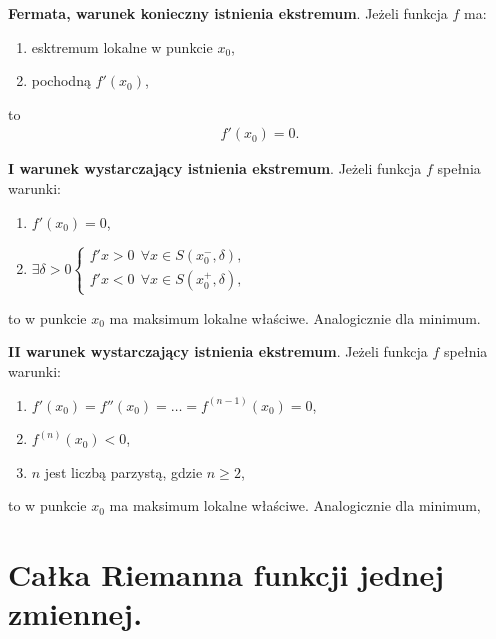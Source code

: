 \documentclass[12pt]{article}
\begin{document}
    \begin{theorem}
        \textbf{Fermata, warunek konieczny istnienia ekstremum}. Jeżeli funkcja $f$ ma:
        \begin{enumerate}
            \item esktremum lokalne w punkcie $x_0$,
            \item pochodną $f'(x_0)$,
        \end{enumerate}
        to
        \begin{align*}
            f'(x_0) = 0.
        \end{align*}
    \end{theorem}

    \begin{theorem}
        \textbf{I warunek wystarczający istnienia ekstremum}. Jeżeli funkcja $f$ spełnia warunki:
        \begin{enumerate}
            \item $f'(x_0) = 0$,
            \item $\exists \delta > 0
            \left\{\begin{matrix}
                       f'{x} > 0 ~~ \forall x \in  S(x^{-}_0, \delta), \\
                       f'{x} < 0 ~~ \forall x \in  S(x^{+}_0, \delta),
            \end{matrix}\right.$
        \end{enumerate}
        to w punkcie $x_0$ ma maksimum lokalne właściwe. Analogicznie dla minimum.
    \end{theorem}

    \begin{theorem}
        \textbf{II warunek wystarczający istnienia ekstremum}. Jeżeli funkcja $f$ spełnia warunki:
        \begin{enumerate}
            \item $f'(x_0) = f''(x_0) = \dots = f^{(n-1)}(x_0) = 0$,
            \item $f^{(n)}(x_0) < 0$,
            \item $n$ jest liczbą parzystą, gdzie $n \geq 2$,
        \end{enumerate}
        to w punkcie $x_0$ ma maksimum lokalne właściwe. Analogicznie dla minimum,
    \end{theorem}

    \newpage

    \section{Całka Riemanna funkcji jednej zmiennej.}
\end{document}
